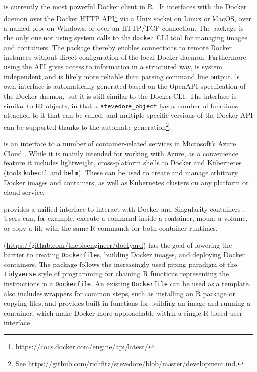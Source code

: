 \textbf{} is currently the most powerful Docker
client in R \citep{cran_stevedore}. It interfaces with the Docker daemon
over the Docker HTTP
API\footnote{\href{https://docs.docker.com/engine/api/latest/}{https://docs.docker.com/engine/api/latest/}}
via a Unix socket on Linux or MacOS, over a named pipe on Windows, or
over an HTTP/TCP connection. The package is the only one not using
system calls to the \texttt{docker} CLI tool for managing images and
containers. The package thereby enables connections to remote Docker
instances without direct configuration of the local Docker daemon.
Furthermore using the API gives access to information in a structured
way, is system independent, and is likely more reliable than parsing
command line output. 's own interface is
automatically generated based on the OpenAPI specification of the Docker
daemon, but it is still similar to the Docker CLI. The interface is
similar to R6 objects, in that a \texttt{stevedore\_object} has a number
of functions attached to it that can be called, and multiple specific
versions of the Docker API can be supported thanks to the automatic
generation\footnote{See \href{https://github.com/richfitz/stevedore/blob/master/development.md}{https://github.com/richfitz/stevedore/blob/master/development.md}.}.

\textbf{} is an interface to a number of
container-related services in Microsoft's
\href{https://azure.microsoft.com/}{Azure Cloud}
\citep{AzureContainers_2019}. While it is mainly intended for working
with Azure, as a convenience feature it includes lightweight,
cross-platform shells to Docker and Kubernetes (tools \texttt{kubectl}
and \texttt{helm}). These can be used to create and manage arbitrary
Docker images and containers, as well as Kubernetes clusters on any
platform or cloud service.

\textbf{} provides a unified interface to interact
with Docker and Singularity containers \citep{cannoodt_babelwhale_2019}.
Users can, for example, execute a command inside a container, mount a
volume, or copy a file with the same R commands for both container
runtimes.

\textbf{}
(\url{https://github.com/thebioengineer/dockyard}) has the goal of
lowering the barrier to creating \texttt{Dockerfile}s, building Docker
images, and deploying Docker containers. The package follows the
increasingly used piping paradigm of the \texttt{tidyverse} style of
programming for chaining R functions representing the instructions in a
\texttt{Dockerfile}. An existing \texttt{Dockerfile} can be used as a
template.  also includes wrappers for common steps, such
as installing an R package or copying files, and provides built-in
functions for building an image and running a container, which make
Docker more approachable within a single R-based user interface.

